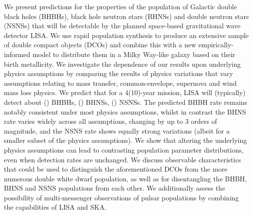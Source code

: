 We present predictions for the properties of the population of Galactic double black holes (BHBHs), black hole neutron stars (BHNSs) and double neutron stars (NSNSs) that will be detectable by the planned space-based gravitational wave detector LISA. We use rapid population synthesis to produce an extensive sample of double compact objects (DCOs) and combine this with a new empirically-informed model to distribute them in a Milky Way-like galaxy based on their birth metallicity. We investigate the dependence of our results upon underlying physics assumptions by comparing the results of \nModels{} physics variations that vary assumptions relating to mass transfer, common-envelope, supernova and wind mass loss physics. We predict that for a 4(10)-year mission, LISA will (typically) detect about \BHBHFourYear{}(\BHBHTenYear{}) BHBHs, \BHNSFourYear{}(\BHNSTenYear{}) BHNSs, \NSNSFourYear{}(\NSNSTenYear{}) NSNSs. The predicted BHBH rate remains notably consistent under most physics assumptions, whilst in contrast the BHNS rate varies widely across all assumptions, changing by up to 3 orders of magnitude, and the NSNS rate shows equally strong variations (albeit for a smaller subset of the physics assumptions). We show that altering the underlying physics assumptions can lead to contrasting population parameter distributions, even when detection rates are unchanged. We discuss observable characteristics that could be used to distinguish the aforementioned DCOs from the more numerous double white dwarf population, as well as for disentangling the BHBH, BHNS and NSNS populations from each other. We additionally assess the possibility of multi-messenger observations of pulsar populations by combining the capabilities of LISA and SKA. 